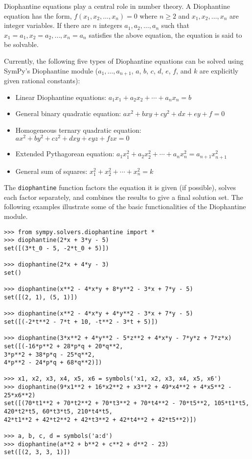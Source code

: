Diophantine equations play a central role in number theory.  A
Diophantine equation has the form, $f(x_1, x_2, \dotsc, x_n) = 0$ where $n \geq
2$ and $x_1, x_2, \dotsc, x_n$ are integer variables. If there are $n$
integers $a_1, a_2, \dotsc, a_n$ such that $x_1 = a_1, x_2 = a_2, \dotsc, x_n =
a_n$ satisfies the above equation, the equation is said to be solvable.

Currently, the following five types of Diophantine equations can be solved using
SymPy's Diophantine module ($a_1, \ldots, a_{n+1}$, $a$, $b$, $c$, $d$, $e$,
$f$, and $k$ are explicitly given rational constants):

\begin{itemize}
    \item Linear Diophantine equations: $a_1x_1 + a_2x_2 + \dotsb{} + a_{n}x_{n} = b$
    \item General binary quadratic equation: $ax^2 + bxy + cy^2 + dx + ey + f = 0$
    \item Homogeneous ternary quadratic equation: $ax^2 + by^2 + cz^2 + dxy + eyz + fzx = 0$
    \item Extended Pythagorean equation: $a_{1}x_{1}^2 + a_{2}x_{2}^2 + \dotsb{} + a_{n}x_{n}^2 = a_{n+1}x_{n+1}^2$
    \item General sum of squares: $x_{1}^2 + x_{2}^2 + \dotsb{} + x_{n}^2 = k$
\end{itemize}

The \verb|diophantine| function factors the equation it is given (if
possible), solves each factor separately, and combines the results to give
a final solution set.
The following examples illustrate some of the
basic functionalities of the Diophantine module.

\begin{verbatim}
>>> from sympy.solvers.diophantine import *
>>> diophantine(2*x + 3*y - 5)
set([(3*t_0 - 5, -2*t_0 + 5)])

>>> diophantine(2*x + 4*y - 3)
set()

>>> diophantine(x**2 - 4*x*y + 8*y**2 - 3*x + 7*y - 5)
set([(2, 1), (5, 1)])

>>> diophantine(x**2 - 4*x*y + 4*y**2 - 3*x + 7*y - 5)
set([(-2*t**2 - 7*t + 10, -t**2 - 3*t + 5)])

>>> diophantine(3*x**2 + 4*y**2 - 5*z**2 + 4*x*y - 7*y*z + 7*z*x)
set([(-16*p**2 + 28*p*q + 20*q**2,
3*p**2 + 38*p*q - 25*q**2,
4*p**2 - 24*p*q + 68*q**2)])

>>> x1, x2, x3, x4, x5, x6 = symbols('x1, x2, x3, x4, x5, x6')
>>> diophantine(9*x1**2 + 16*x2**2 + x3**2 + 49*x4**2 + 4*x5**2 - 25*x6**2)
set([(70*t1**2 + 70*t2**2 + 70*t3**2 + 70*t4**2 - 70*t5**2, 105*t1*t5,
420*t2*t5, 60*t3*t5, 210*t4*t5,
42*t1**2 + 42*t2**2 + 42*t3**2 + 42*t4**2 + 42*t5**2)])

>>> a, b, c, d = symbols('a:d')
>>> diophantine(a**2 + b**2 + c**2 + d**2 - 23)
set([(2, 3, 3, 1)])
\end{verbatim}
